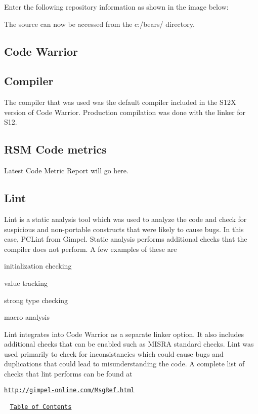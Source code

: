 Enter the following repository information as shown in the image below\+:



The source can now be accessed from the c\+:/bears/ directory.\hypertarget{index_CodeWarrior}{}\subsection{Code Warrior}\label{index_CodeWarrior}
\hypertarget{index_Compiler}{}\subsection{Compiler}\label{index_Compiler}
The compiler that was used was the default compiler included in the S12\+X version of Code Warrior. Production compilation was done with the linker for S12.\hypertarget{index_RSM}{}\subsection{R\+S\+M Code metrics}\label{index_RSM}
Latest Code Metric Report will go here.\hypertarget{index_Lint}{}\subsection{Lint}\label{index_Lint}
Lint is a static analysis tool which was used to analyze the code and check for suspicious and non-\/portable constructs that were likely to cause bugs. In this case, P\+C\+Lint from Gimpel. Static analysis performs additional checks that the compiler does not perform. A few examples of these are
\begin{DoxyItemize}
\item initialization checking
\item value tracking
\item strong type checking
\item macro analysis
\end{DoxyItemize}

Lint integrates into Code Warrior as a separate linker option. It also includes additional checks that can be enabled such as M\+I\+S\+R\+A standard checks. Lint was used primarily to check for inconsistancies which could cause bugs and duplications that could lead to misunderstanding the code. A complete list of checks that lint performs can be found at ~\newline


\href{http://gimpel-online.com/MsgRef.html}{\tt http\+://gimpel-\/online.\+com/\+Msg\+Ref.\+html}

~\newline
\href{#Contents}{\tt Table of Contents}~\newline
 

 